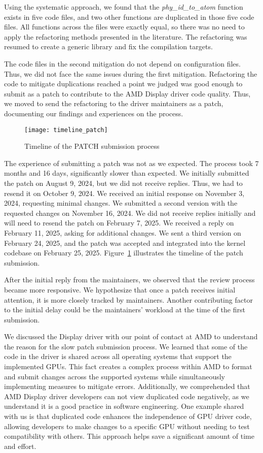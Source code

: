 Using the systematic approach, we found that the \textit{phy\_id\_to\_atom} function 
exists in five code files, and two other functions are duplicated
in those five code files. All functions across the files were exactly equal,
so there was no need to apply the refactoring methods presented in the literature.
The refactoring was resumed to create a generic library and fix the compilation targets.

The code files in the second mitigation do not depend on configuration files. Thus,
we did not face the same issues during the first mitigation. Refactoring the code
to mitigate duplications reached a point we judged was good enough to submit as a
patch to contribute to the AMD Display driver code quality. Thus, we moved to send
the refactoring to the driver maintainers as a patch, documenting our findings and experiences
on the process.

\begin{figure}
\texttt{[image: timeline\_patch]}
\caption{Timeline of the PATCH submission process}
\label{fig:timeline}
\end{figure}

The experience of submitting a patch was not as we expected. The process took 7 
months and 16 days, significantly slower than expected. We initially submitted 
the patch on August 9, 2024, but we did not receive replies. Thus, we had to 
resend it on October 9, 2024. We received an initial response on November 3, 2024, 
requesting minimal changes. We submitted a second version with the requested 
changes on November 16, 2024. We did not receive replies initially and will 
need to resend the patch on February 7, 2025. We received a reply on 
February 11, 2025, asking for additional changes. We sent a third version on 
February 24, 2025, and the patch was accepted and integrated into the kernel 
codebase on February 25, 2025. Figure~\ref{fig:timeline} illustrates the 
timeline of the patch submission.

After the initial reply from the maintainers, we observed that the review process 
became more responsive. We hypothesize that once a patch receives initial attention, 
it is more closely tracked by maintainers. Another contributing factor to the initial 
delay could be the maintainers' workload at the time of the first submission.

We discussed the Display driver with our point of contact at AMD to understand the 
reason for the slow patch submission process. We learned that some of the code in 
the driver is shared across all operating systems that support the implemented GPUs. 
This fact creates a complex process within AMD to format and submit changes across 
the supported systems while simultaneously implementing measures to mitigate errors. 
Additionally, we comprehended that AMD Display driver developers can not view 
duplicated code negatively, as we understand it is a good practice in software engineering. 
One example shared with us is that duplicated code enhances the independence of 
GPU driver code, allowing developers to make changes to a specific GPU without 
needing to test compatibility with others. This approach helps save a 
significant amount of time and effort.

